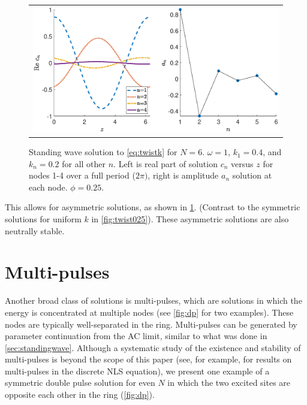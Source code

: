 \documentclass[12pt,reqno]{amsart}
\def\noi{\noindent}
\begin{document}
\begin{figure}[H]
\begin{center}
\begin{tabular}{c}
\includegraphics[width=15cm]{images/even6assym.eps}
\end{tabular}
\end{center}
\caption{Standing wave solution to \cref{eq:twistk} for $N = 6$. $\omega = 1$, $k_1 = 0.4$, and $k_n = 0.2$ for all other $n$. Left is real part of solution $c_n$ versus $z$ for nodes 1-4 over a full period ($2 \pi)$, right is amplitude $a_n$ solution at each node. $\phi = 0.25$.}
\label{fig:even6assym}
\end{figure}

\noi This allows for asymmetric solutions, as shown in \cref{fig:even6assym}. (Contrast to the symmetric solutions for uniform $k$ in \cref{fig:twist025}). These asymmetric solutions are also neutrally stable.

\section{Multi-pulses}

Another broad class of solutions is multi-pulses, which are solutions in which the energy is concentrated at multiple nodes (see \cref{fig:dp} for two examples). These nodes are typically well-separated in the ring. Multi-pulses can be generated by parameter continuation from the AC limit, similar to what was done in \cref{sec:standingwave}. Although a systematic study of the existence and stability of multi-pulses is beyond the scope of this paper (see, for example, \cite{Parker2020} for results on multi-pulses in the discrete NLS equation), we present one example of a symmetric double pulse solution for even $N$ in which the two excited sites are opposite each other in the ring (\cref{fig:dp}). 
\end{document}
